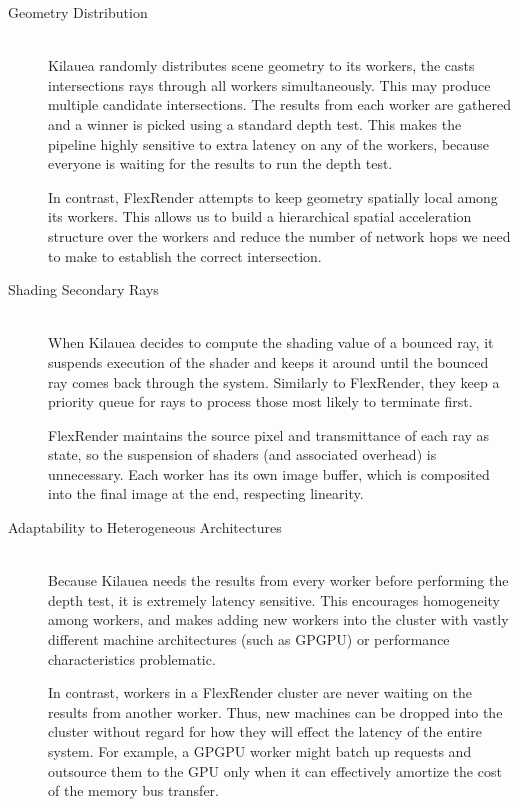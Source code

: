 \documentclass[12pt]{ucthesis}
\begin{document}
\begin{description}
    \item[Geometry Distribution] \hfill \\
        Kilauea randomly distributes scene geometry to
        its workers, the casts intersections rays through all workers
        simultaneously. This may produce multiple candidate intersections. The
        results from each worker are gathered and a winner is picked using a
        standard depth test. This makes the pipeline highly sensitive to extra
        latency on any of the workers, because everyone is waiting for the
        results to run the depth test.

        In contrast, FlexRender attempts to keep geometry spatially local among
        its workers. This allows us to build a hierarchical spatial acceleration
        structure over the workers and reduce the number of network hops we need
        to make to establish the correct intersection.
    \item[Shading Secondary Rays] \hfill \\
        When Kilauea decides to compute the shading value of a bounced ray, it
        suspends execution of the shader and keeps it around until the bounced
        ray comes back through the system. Similarly to FlexRender, they keep
        a priority queue for rays to process those most likely to terminate
        first.

        FlexRender maintains the source pixel and transmittance of each ray as
        state, so the suspension of shaders (and associated overhead) is
        unnecessary. Each worker has its own image buffer, which is composited
        into the final image at the end, respecting linearity.
    \item[Adaptability to Heterogeneous Architectures] \hfill \\
        Because Kilauea needs the results from every worker before performing
        the depth test, it is extremely latency sensitive. This encourages
        homogeneity among workers, and makes adding new workers into the cluster
        with vastly different machine architectures (such as GPGPU) or performance
        characteristics problematic.

        In contrast, workers in a FlexRender cluster are never waiting on
        the results from another worker. Thus, new machines can be dropped into the
        cluster without regard for how they will effect the latency of the entire
        system. For example, a GPGPU worker might batch up requests and outsource
        them to the GPU only when it can effectively amortize the cost of the
        memory bus transfer.
\end{description}
\end{document}
